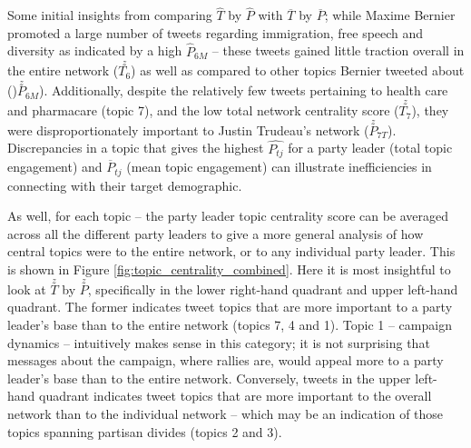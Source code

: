 Some initial insights from comparing \textbf{$\hat{T}$} by \textbf{$\hat{P}$}
with \textbf{$\overline{T}$} by \textbf{$\overline{P}$}; while Maxime Bernier
promoted a large number of tweets regarding immigration, free speech and
diversity as indicated by a high $\hat{P}_{6M}$ -- these tweets gained little
traction overall in the entire network ($\stackrel{z}{T_{6}}$) as well as
compared to other topics Bernier tweeted about ()$\stackrel{z}{P}_{6M}$).
Additionally, despite the relatively few tweets pertaining to health care and
pharmacare (topic 7), and the low total network centrality score
($\stackrel{z}{T_{7}}$), they were disproportionately important to Justin
Trudeau's network ($\stackrel{z}{P}_{7T}$). Discrepancies in a topic that gives
the highest $\hat{P_{tj}}$ for a party leader (total topic engagement) and
$\overline{P}_{tj}$  (mean topic engagement) can illustrate inefficiencies in
connecting with their target demographic.

As well, for each topic -- the party leader topic centrality score can be
averaged across all the different party leaders to give a more general analysis
of how central topics were to the entire network, or to any individual party
leader. This is shown in Figure \ref{fig:topic_centrality_combined}. Here it is
most insightful to look at \textbf{$\stackrel{z}{T}$} by
\textbf{$\stackrel{z}{P}$}, specifically in the lower right-hand quadrant and
upper left-hand quadrant. The former indicates tweet topics that are more
important to a party leader's base than to the entire network (topics 7, 4 and
1). Topic 1 -- campaign dynamics -- intuitively makes sense in this category; it
is not surprising that messages about the campaign, where rallies are, \etc
would appeal more to a party leader's base than to the entire network.
Conversely, tweets in the upper left-hand quadrant indicates tweet topics that
are more important to the overall network than to the individual network --
which may be an indication of those topics spanning partisan divides (topics 2
and 3).

